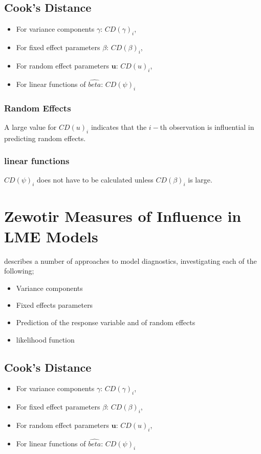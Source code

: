 \documentclass[12pt, a4paper]{article}
\begin{document}
	\subsection{Cook's Distance}
	\begin{itemize}
		\item For variance components $\gamma$: $CD(\gamma)_i$,
		\item For fixed effect parameters $\beta$: $CD(\beta)_i$,
		\item For random effect parameters $\boldsymbol{u}$: $CD(u)_i$,
		\item For linear functions of $\hat{beta}$: $CD(\psi)_i$
	\end{itemize}
	

	\subsubsection{Random Effects}
	
	A large value for $CD(u)_i$ indicates that the $i-$th observation is influential in predicting random effects.
	
	\subsubsection{linear functions}
	
	$CD(\psi)_i$ does not have to be calculated unless $CD(\beta)_i$ is large.
	
	

\section{Zewotir Measures of Influence in LME Models}%
\citet{Zewotir} describes a number of approaches to model diagnostics, investigating each of the following;
\begin{itemize}
	\item Variance components
	\item Fixed effects parameters
	\item Prediction of the response variable and of random effects
	\item likelihood function
\end{itemize}

\subsection{Cook's Distance}
\begin{itemize}
	\item For variance components $\gamma$: $CD(\gamma)_i$,
	\item For fixed effect parameters $\beta$: $CD(\beta)_i$,
	\item For random effect parameters $\boldsymbol{u}$: $CD(u)_i$,
	\item For linear functions of $\hat{beta}$: $CD(\psi)_i$
\end{itemize}
\end{document}
